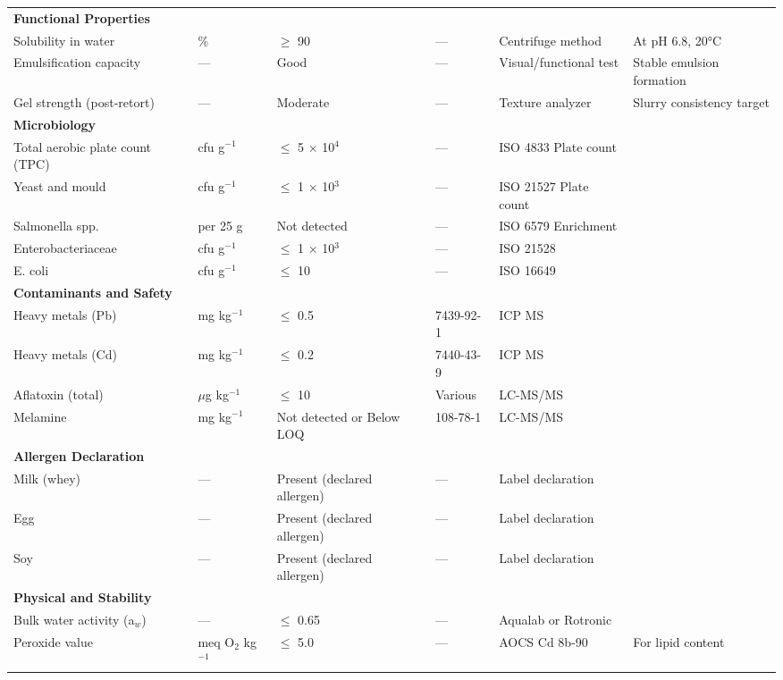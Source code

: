 \begin{longtable}{@{}p{6.0cm}p{1.5cm}p{1.8cm}p{2.0cm}p{3.0cm}p{3.0cm}@{}}
\multicolumn{6}{l}{\textbf{Functional Properties}} \\[3pt]
Solubility in water & \% & $\ge$ 90 & --- & Centrifuge method & At pH 6.8, 20°C \\[3pt]
Emulsification capacity & --- & Good & --- & Visual/functional test & Stable emulsion formation \\[3pt]
Gel strength (post-retort) & --- & Moderate & --- & Texture analyzer & Slurry consistency target \\[6pt]

\multicolumn{6}{l}{\textbf{Microbiology}} \\[3pt]
Total aerobic plate count (TPC) & cfu g$^{-1}$ & $\le$ 5 $\times$ 10$^4$ & --- & ISO 4833 Plate count & \\[3pt]
Yeast and mould & cfu g$^{-1}$ & $\le$ 1 $\times$ 10$^3$ & --- & ISO 21527 Plate count & \\[3pt]
Salmonella spp. & per 25 g & Not detected & --- & ISO 6579 Enrichment & \\[3pt]
Enterobacteriaceae & cfu g$^{-1}$ & $\le$ 1 $\times$ 10$^3$ & --- & ISO 21528 & \\[3pt]
E. coli & cfu g$^{-1}$ & $\le$ 10 & --- & ISO 16649 & \\[6pt]

\multicolumn{6}{l}{\textbf{Contaminants and Safety}} \\[3pt]
Heavy metals (Pb) & mg kg$^{-1}$ & $\le$ 0.5 & 7439-92-1 & ICP MS & \\[3pt]
Heavy metals (Cd) & mg kg$^{-1}$ & $\le$ 0.2 & 7440-43-9 & ICP MS & \\[3pt]
Aflatoxin (total) & $\mu$g kg$^{-1}$ & $\le$ 10 & Various & LC-MS/MS & \\[3pt]
Melamine & mg kg$^{-1}$ & Not detected or Below LOQ & 108-78-1 & LC-MS/MS & \\[6pt]

\multicolumn{6}{l}{\textbf{Allergen Declaration}} \\[3pt]
Milk (whey) & --- & Present (declared allergen) & --- & Label declaration & \\[3pt]
Egg & --- & Present (declared allergen) & --- & Label declaration & \\[3pt]
Soy & --- & Present (declared allergen) & --- & Label declaration & \\[6pt]

\multicolumn{6}{l}{\textbf{Physical and Stability}} \\[3pt]
Bulk water activity (a$_w$) & --- & $\le$ 0.65 & --- & Aqualab or Rotronic & \\[3pt]
Peroxide value & meq O$_2$ kg$^{-1}$ & $\le$ 5.0 & --- & AOCS Cd 8b-90 & For lipid content \\[6pt]


\end{longtable}
